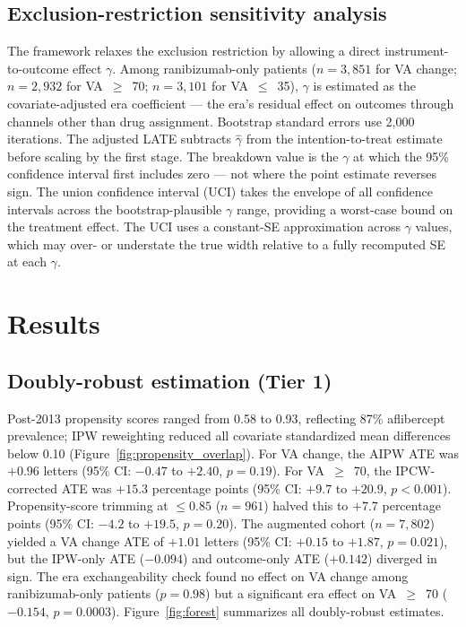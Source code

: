 \documentclass{article}
\begin{document}
\subsection{Exclusion-restriction sensitivity analysis}

The \citet{conley2012} framework relaxes the exclusion restriction by allowing a direct instrument-to-outcome effect $\gamma$. Among ranibizumab-only patients ($n = 3{,}851$ for VA change; $n = 2{,}932$ for VA~$\geq$~70; $n = 3{,}101$ for VA~$\leq$~35), $\gamma$ is estimated as the covariate-adjusted era coefficient --- the era's residual effect on outcomes through channels other than drug assignment. Bootstrap standard errors use 2,000 iterations. The adjusted LATE subtracts $\hat{\gamma}$ from the intention-to-treat estimate before scaling by the first stage. The breakdown value is the $\gamma$ at which the 95\% confidence interval first includes zero --- not where the point estimate reverses sign. The union confidence interval (UCI) takes the envelope of all confidence intervals across the bootstrap-plausible $\gamma$ range, providing a worst-case bound on the treatment effect. The UCI uses a constant-SE approximation across $\gamma$ values, which may over- or understate the true width relative to a fully recomputed SE at each $\gamma$.

\section{Results}

\subsection{Doubly-robust estimation (Tier 1)}

Post-2013 propensity scores ranged from 0.58 to 0.93, reflecting 87\% aflibercept prevalence; IPW reweighting reduced all covariate standardized mean differences below 0.10 (Figure~\ref{fig:propensity_overlap}). For VA change, the AIPW ATE was $+0.96$ letters (95\% CI: $-0.47$ to $+2.40$, $p = 0.19$). For VA~$\geq$~70, the IPCW-corrected ATE was $+15.3$ percentage points (95\% CI: $+9.7$ to $+20.9$, $p < 0.001$). Propensity-score trimming at $\leq 0.85$ ($n = 961$) halved this to $+7.7$ percentage points (95\% CI: $-4.2$ to $+19.5$, $p = 0.20$). The augmented cohort ($n = 7{,}802$) yielded a VA change ATE of $+1.01$ letters (95\% CI: $+0.15$ to $+1.87$, $p = 0.021$), but the IPW-only ATE ($-0.094$) and outcome-only ATE ($+0.142$) diverged in sign. The era exchangeability check found no effect on VA change among ranibizumab-only patients ($p = 0.98$) but a significant era effect on VA~$\geq$~70 ($-0.154$, $p = 0.0003$). Figure~\ref{fig:forest} summarizes all doubly-robust estimates.
\end{document}

